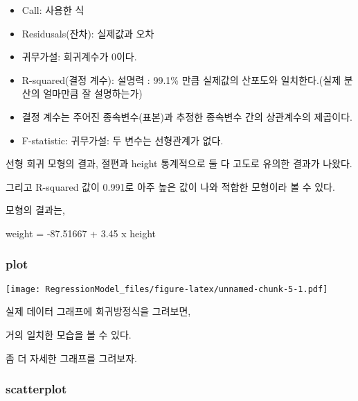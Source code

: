 \documentclass[
]{article}
\newenvironment{Shaded}{\begin{snugshade}}{\end{snugshade}}
\newcommand{\AttributeTok}[1]{\textcolor[rgb]{0.77,0.63,0.00}{#1}}
\newcommand{\FunctionTok}[1]{\textcolor[rgb]{0.00,0.00,0.00}{#1}}
\newcommand{\NormalTok}[1]{#1}
\newcommand{\SpecialCharTok}[1]{\textcolor[rgb]{0.00,0.00,0.00}{#1}}
\newcommand{\StringTok}[1]{\textcolor[rgb]{0.31,0.60,0.02}{#1}}
\providecommand{\tightlist}{%
  \setlength{\itemsep}{0pt}\setlength{\parskip}{0pt}}
\begin{document}
\begin{itemize}
\tightlist
\item
  Call: 사용한 식
\item
  Residusals(잔차): 실제값과 오차
\item
  귀무가설: 회귀계수가 0이다.
\item
  R-squared(결정 계수): 설명력 : 99.1\% 만큼 실제값의 산포도와 일치한다.(실제 분산의 얼마만큼 잘 설명하는가)
\item
  결정 계수는 주어진 종속변수(표본)과 추정한 종속변수 간의 상관계수의 제곱이다.
\item
  F-statistic: 귀무가설: 두 변수는 선형관계가 없다.
\end{itemize}

선형 회귀 모형의 결과, 절편과 height 통계적으로 둘 다 고도로 유의한 결과가 나왔다.

그리고 R-squared 값이 0.991로 아주 높은 값이 나와 적합한 모형이라 볼 수 있다.

모형의 결과는,

weight = -87.51667 + 3.45 x height

\hypertarget{plot}{%
\subsubsection{plot}\label{plot}}

\begin{Shaded}
\end{Shaded}

\texttt{[image: RegressionModel\_files/figure-latex/unnamed-chunk-5-1.pdf]}

실제 데이터 그래프에 회귀방정식을 그려보면,

거의 일치한 모습을 볼 수 있다.

좀 더 자세한 그래프를 그려보자.

\hypertarget{scatterplot}{%
\subsubsection{scatterplot}\label{scatterplot}}
\end{document}
